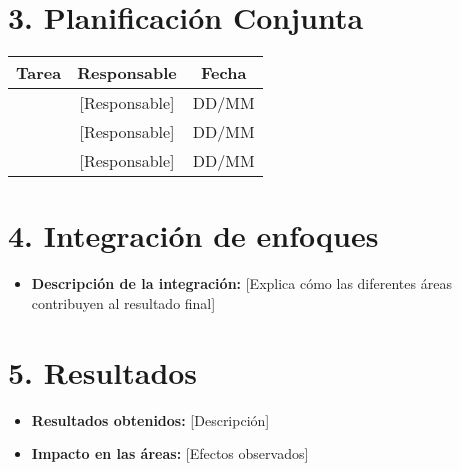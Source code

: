 \documentclass[12pt, a4paper]{article}
\begin{document}
\section*{3. Planificación Conjunta}
\begin{tabular}{|c|c|c|}
    \hline
    \textbf{Tarea} & \textbf{Responsable} & \textbf{Fecha} \\ \hline
    [Tarea 1] & [Responsable] & DD/MM \\ \hline
    [Tarea 2] & [Responsable] & DD/MM \\ \hline
    [Tarea 3] & [Responsable] & DD/MM \\ \hline
\end{tabular}

\section*{4. Integración de enfoques}
\begin{itemize}
    \item \textbf{Descripción de la integración:} [Explica cómo las diferentes áreas contribuyen al resultado final]
\end{itemize}

\section*{5. Resultados}
\begin{itemize}
    \item \textbf{Resultados obtenidos:} [Descripción]
    \item \textbf{Impacto en las áreas:} [Efectos observados]
\end{itemize}
\end{document}
